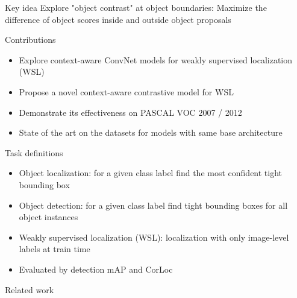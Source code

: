 \documentclass[final, xcolor={dvipsnames}]{beamer}
\def \postercolumnbreak {\vrule width 5pt height -2.5cm \hskip1cm}
\begin{document}
\begin{frame}[t,fragile]{}
\begin{mdframed}[style = posterframe]
\begin{columns}[t,onlytextwidth]
\begin{column}{.26\linewidth}
	\begin{mdframed}[style = posteremphasize]
			\begin{block}{Key idea}
				\centering Explore "object contrast" at object boundaries: Maximize the difference of object scores inside and outside object proposals
			
			\end{block}
		\end{mdframed}

	 \begin{block}{Contributions}
		\begin{itemize}
			\item Explore context-aware ConvNet models for weakly supervised localization (WSL)
			\item Propose a novel context-aware contrastive model for WSL
			\item Demonstrate its effectiveness on PASCAL VOC 2007 / 2012
			\item State of the art on the datasets for models with same base architecture
		\end{itemize}
		
	 \end{block}

\begin{block}{Task definitions}
		\begin{itemize}
			\item Object localization: for a given class label find the most confident tight bounding box
			\item Object detection: for a given class label find tight bounding boxes for all object instances
			\item Weakly supervised localization (WSL): localization with only image-level labels at train time
			\item Evaluated by detection mAP and CorLoc
		\end{itemize}
\end{block}
	 
	 \begin{block}{Related work}
		\scriptsize
		
		
	\end{block}
	\end{column}
	\postercolumnbreak

\begin{column}{.44\linewidth}
	

\end{column}
\end{columns}
\end{mdframed}
\end{frame}
\end{document}
